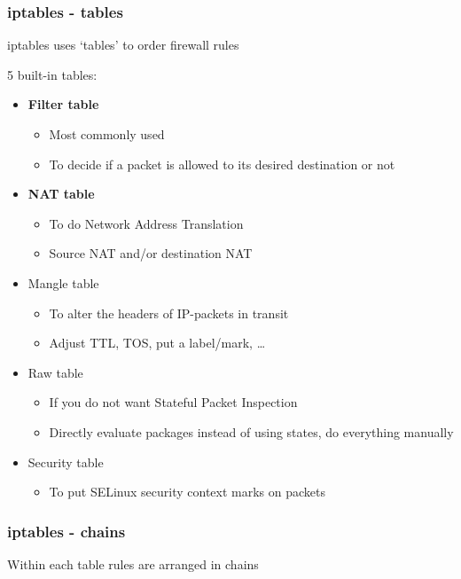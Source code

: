 \documentclass{article}
\begin{document}
\subsubsection{iptables - tables}

iptables uses `tables' to order firewall rules

5 built-in tables:

\begin{itemize}
    \item \textbf{Filter table}
    \begin{itemize}
        \item Most commonly used
        \item To decide if a packet is allowed to its desired destination or not
    \end{itemize}
    \item \textbf{NAT table}
    \begin{itemize}
        \item To do Network Address Translation
        \item Source NAT and/or destination NAT
    \end{itemize}
    \item Mangle table
    \begin{itemize}
        \item To alter the headers of IP-packets in transit
        \item Adjust TTL, TOS, put a label/mark, \dots
    \end{itemize}
    \item Raw table
    \begin{itemize}
        \item If you do not want Stateful Packet Inspection
        \item Directly evaluate packages instead of using states, do everything manually
    \end{itemize}
    \item Security table
    \begin{itemize}
        \item To put SELinux security context marks on packets
    \end{itemize}
\end{itemize}

\subsubsection{iptables - chains}

Within each table rules are arranged in chains
\end{document}
